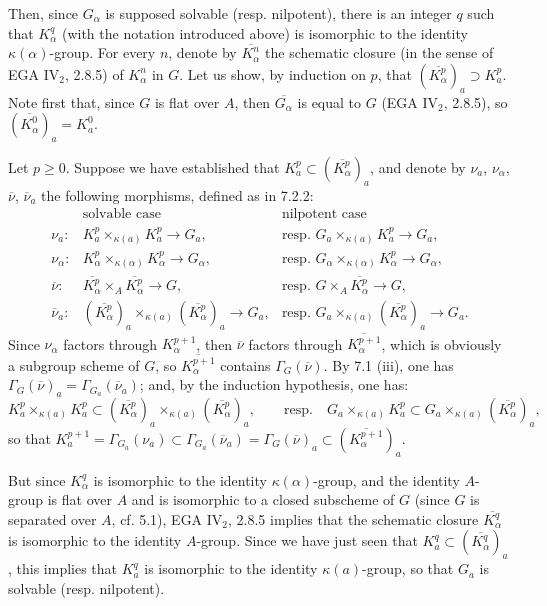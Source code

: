 Then, since $G_\alpha$ is supposed solvable (resp. nilpotent), there is an integer $q$ such that $K_\alpha^q$ (with the notation introduced above) is isomorphic to the identity $\kappa(\alpha)$-group. For every $n$, denote by $\overline{K_\alpha^n}$ the schematic closure (in the sense of EGA IV$_2$, 2.8.5) of $K_\alpha^n$ in $G$. Let us show, by induction on $p$, that $(\overline{K_\alpha^p})_a\supset K_a^p$. Note first that, since $G$ is flat over $A$, then $\overline{G_\alpha}$ is equal to $G$ (EGA IV$_2$, 2.8.5), so $(\overline{K_\alpha^0})_a=K_a^0$.

Let $p\geq0$. Suppose we have established that $K_a^p\subset(\overline{K_\alpha^p})_a$, and denote by $\nu_a$, $\nu_\alpha$, $\overline\nu$, $\overline\nu_a$ the following morphisms, defined as in 7.2.2:
\[
\begin{array}{lll}
&\text{solvable case}&\text{nilpotent case}\\[3pt]
\nu_a:&K_a^p\times_{\kappa(a)}K_a^p\to G_a,&\text{resp. }G_a\times_{\kappa(a)}K_a^p\to G_a,\\
\nu_\alpha:&K_\alpha^p\times_{\kappa(\alpha)}K_\alpha^p\to G_\alpha,&\text{resp. }G_\alpha\times_{\kappa(\alpha)}K_\alpha^p\to G_\alpha,\\
\overline\nu:&\overline{K_\alpha^p}\times_A\overline{K_\alpha^p}\to G,&\text{resp. }G\times_A\overline{K_\alpha^p}\to G,\\
\overline\nu_a:&(\overline{K_\alpha^p})_a\times_{\kappa(a)}(\overline{K_\alpha^p})_a\to G_a,&\text{resp. }G_a\times_{\kappa(a)}(\overline{K_\alpha^p})_a\to G_a.
\end{array}
\]
Since $\nu_\alpha$ factors through $K_\alpha^{p+1}$, then $\overline\nu$ factors through $\overline{K_\alpha^{p+1}}$, which is obviously a subgroup scheme of $G$, so $\overline{K_\alpha^{p+1}}$ contains $\Gamma_G(\overline\nu)$. By 7.1 (iii), one has $\Gamma_G(\overline\nu)_a=\Gamma_{G_a}(\overline\nu_a)$; and, by the induction hypothesis, one has:
\[
K_a^p\times_{\kappa(a)}K_a^p\subset(\overline{K_\alpha^p})_a\times_{\kappa(a)}(\overline{K_\alpha^p})_a,\qquad\text{resp.}\quad G_a\times_{\kappa(a)}K_a^p\subset G_a\times_{\kappa(a)}(\overline{K_\alpha^p})_a,
\]
so that $K_a^{p+1}=\Gamma_{G_a}(\nu_a)\subset\Gamma_{G_a}(\overline\nu_a)=\Gamma_G(\overline\nu)_a\subset(\overline{K_\alpha^{p+1}})_a$.

But since $K_\alpha^q$ is isomorphic to the identity $\kappa(\alpha)$-group, and the identity $A$-group is flat over $A$ and is isomorphic to a closed subscheme of $G$ (since $G$ is separated over $A$, cf. 5.1), EGA IV$_2$, 2.8.5 implies that the schematic closure $\overline{K_\alpha^q}$ is isomorphic to the identity $A$-group. Since we have just seen that $K_a^q\subset(\overline{K_\alpha^q})_a$, this implies that $K_a^q$ is isomorphic to the identity $\kappa(a)$-group, so that $G_a$ is solvable (resp. nilpotent).

